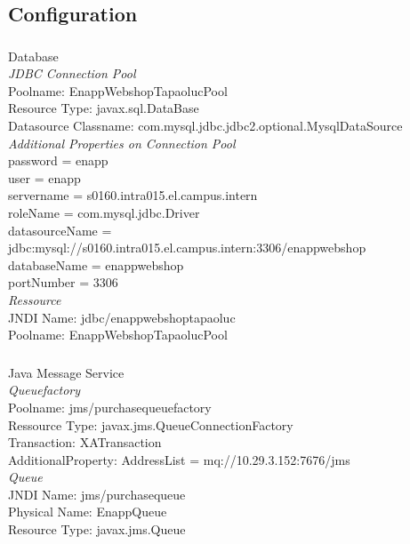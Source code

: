\documentclass[11pt]{amsart}
\begin{document}
\subsection{Configuration}
\subsubsection{}Database \\
\textit{JDBC Connection Pool}\\
Poolname: EnappWebshopTapaolucPool \\
Resource Type: javax.sql.DataBase \\
Datasource Classname: com.mysql.jdbc.jdbc2.optional.MysqlDataSource \\
\textit{Additional Properties on Connection Pool} \\
password = enapp \\
user = enapp \\
servername = s0160.intra015.el.campus.intern \\
roleName = com.mysql.jdbc.Driver \\
datasourceName = jdbc:mysql://s0160.intra015.el.campus.intern:3306/enappwebshop \\
databaseName = enappwebshop \\
portNumber = 3306 \\
%
\textit{Ressource} \\
JNDI Name: jdbc/enappwebshoptapaoluc \\
Poolname: EnappWebshopTapaolucPool \\
%
\subsubsection{}Java Message Service \\
\textit{Queuefactory} \\
Poolname: jms/purchasequeuefactory \\
Ressource Type: javax.jms.QueueConnectionFactory \\
Transaction: XATransaction \\
AdditionalProperty: AddressList = mq://10.29.3.152:7676/jms \\
\textit{Queue} \\
JNDI Name: jms/purchasequeue \\
Physical Name: EnappQueue \\
Resource Type: javax.jms.Queue \\
%
\end{document}
